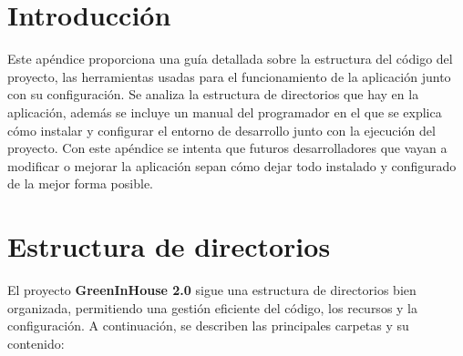 
\section{Introducción}
Este apéndice proporciona una guía detallada sobre la estructura del código del proyecto, las herramientas usadas para el funcionamiento de la aplicación junto con su configuración.
Se analiza la estructura de directorios que hay en la aplicación, además se incluye un manual del programador en el que se explica cómo instalar y configurar el entorno de desarrollo junto con la ejecución del proyecto.
Con este apéndice se intenta que futuros desarrolladores que vayan a modificar o mejorar la aplicación sepan cómo dejar todo instalado y configurado de la mejor forma posible.

\section{Estructura de directorios}

El proyecto \textbf{GreenInHouse 2.0} sigue una estructura de directorios bien organizada, permitiendo una gestión eficiente del código, los recursos y la configuración. A continuación, se describen las principales carpetas y su contenido:

